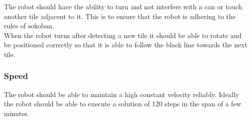 \documentclass[../../main.tex]{subfiles}
\begin{document}
The robot should have the ability to turn and not interfere with a can or touch another tile adjacent to it. This is to ensure that the robot is adhering to the rules of sokoban. \\
When the robot turns after detecting a new tile it should be able to rotate and be positioned correctly so that it is able to follow the black line towards the next tile.

\subsubsection{Speed}%
\label{sub:speed}

The robot should be able to maintain a high constant velocity reliably. Ideally the robot should be able to execute a solution of 120 steps in the span of a few minutes.

	
\end{document}
